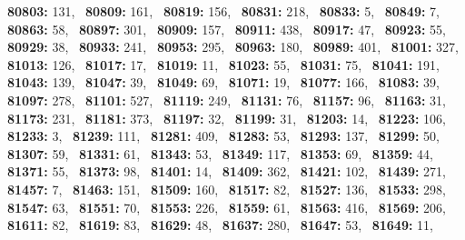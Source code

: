 \textbf{80803:} 131,\allowbreak~ 
\textbf{80809:} 161,\allowbreak~ 
\textbf{80819:} 156,\allowbreak~ 
\textbf{80831:} 218,\allowbreak~ 
\textbf{80833:} 5,\allowbreak~ 
\textbf{80849:} 7,\allowbreak~ 
\textbf{80863:} 58,\allowbreak~ 
\textbf{80897:} 301,\allowbreak~ 
\textbf{80909:} 157,\allowbreak~ 
\textbf{80911:} 438,\allowbreak~ 
\textbf{80917:} 47,\allowbreak~ 
\textbf{80923:} 55,\allowbreak~ 
\textbf{80929:} 38,\allowbreak~ 
\textbf{80933:} 241,\allowbreak~ 
\textbf{80953:} 295,\allowbreak~ 
\textbf{80963:} 180,\allowbreak~ 
\textbf{80989:} 401,\allowbreak~ 
\textbf{81001:} 327,\allowbreak~ 
\textbf{81013:} 126,\allowbreak~ 
\textbf{81017:} 17,\allowbreak~ 
\textbf{81019:} 11,\allowbreak~ 
\textbf{81023:} 55,\allowbreak~ 
\textbf{81031:} 75,\allowbreak~ 
\textbf{81041:} 191,\allowbreak~ 
\textbf{81043:} 139,\allowbreak~ 
\textbf{81047:} 39,\allowbreak~ 
\textbf{81049:} 69,\allowbreak~ 
\textbf{81071:} 19,\allowbreak~ 
\textbf{81077:} 166,\allowbreak~ 
\textbf{81083:} 39,\allowbreak~ 
\textbf{81097:} 278,\allowbreak~ 
\textbf{81101:} 527,\allowbreak~ 
\textbf{81119:} 249,\allowbreak~ 
\textbf{81131:} 76,\allowbreak~ 
\textbf{81157:} 96,\allowbreak~ 
\textbf{81163:} 31,\allowbreak~ 
\textbf{81173:} 231,\allowbreak~ 
\textbf{81181:} 373,\allowbreak~ 
\textbf{81197:} 32,\allowbreak~ 
\textbf{81199:} 31,\allowbreak~ 
\textbf{81203:} 14,\allowbreak~ 
\textbf{81223:} 106,\allowbreak~ 
\textbf{81233:} 3,\allowbreak~ 
\textbf{81239:} 111,\allowbreak~ 
\textbf{81281:} 409,\allowbreak~ 
\textbf{81283:} 53,\allowbreak~ 
\textbf{81293:} 137,\allowbreak~ 
\textbf{81299:} 50,\allowbreak~ 
\textbf{81307:} 59,\allowbreak~ 
\textbf{81331:} 61,\allowbreak~ 
\textbf{81343:} 53,\allowbreak~ 
\textbf{81349:} 117,\allowbreak~ 
\textbf{81353:} 69,\allowbreak~ 
\textbf{81359:} 44,\allowbreak~ 
\textbf{81371:} 55,\allowbreak~ 
\textbf{81373:} 98,\allowbreak~ 
\textbf{81401:} 14,\allowbreak~ 
\textbf{81409:} 362,\allowbreak~ 
\textbf{81421:} 102,\allowbreak~ 
\textbf{81439:} 271,\allowbreak~ 
\textbf{81457:} 7,\allowbreak~ 
\textbf{81463:} 151,\allowbreak~ 
\textbf{81509:} 160,\allowbreak~ 
\textbf{81517:} 82,\allowbreak~ 
\textbf{81527:} 136,\allowbreak~ 
\textbf{81533:} 298,\allowbreak~ 
\textbf{81547:} 63,\allowbreak~ 
\textbf{81551:} 70,\allowbreak~ 
\textbf{81553:} 226,\allowbreak~ 
\textbf{81559:} 61,\allowbreak~ 
\textbf{81563:} 416,\allowbreak~ 
\textbf{81569:} 206,\allowbreak~ 
\textbf{81611:} 82,\allowbreak~ 
\textbf{81619:} 83,\allowbreak~ 
\textbf{81629:} 48,\allowbreak~ 
\textbf{81637:} 280,\allowbreak~ 
\textbf{81647:} 53,\allowbreak~ 
\textbf{81649:} 11,\allowbreak~ 
